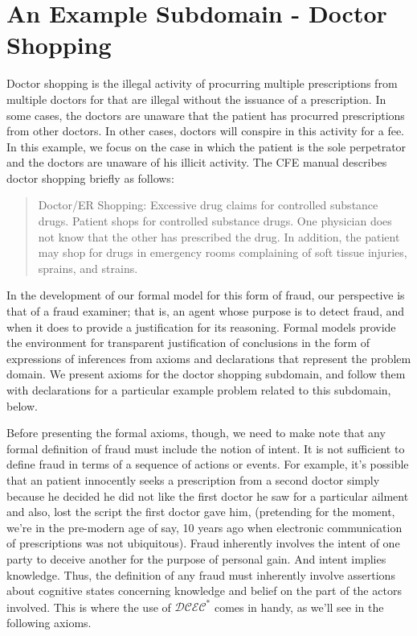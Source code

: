 \section{An Example Subdomain - Doctor Shopping}

Doctor shopping is the illegal activity of procurring multiple prescriptions from multiple doctors for that are illegal without the issuance of a prescription.  In some cases, the doctors are unaware that the patient has procurred prescriptions from other doctors.  In other cases, doctors will conspire in this activity for a fee.  In this example, we focus on the case in which the patient is the sole perpetrator and the doctors are unaware of his illicit activity.  The CFE manual describes doctor shopping briefly as follows:

\blockquote{Doctor/ER Shopping: 
Excessive drug claims for controlled substance drugs. Patient shops for controlled 
substance drugs. One physician does not know that the other has prescribed the drug. In 
addition, the patient may shop for drugs in emergency rooms complaining of soft tissue 
injuries, sprains, and strains.}

In the development of our formal model for this form of fraud, our perspective is that of a fraud examiner; that is, an agent whose purpose is to detect fraud, and when it does to provide a justification for its reasoning.  Formal models provide the environment for transparent  justification of conclusions in the form of expressions of inferences from axioms and declarations that represent the problem domain.  We present axioms for the doctor shopping subdomain, and follow them with declarations for a particular example problem related to this subdomain, below.

Before presenting the formal axioms, though, we need to make note that any formal definition of fraud must include the notion of intent.  It is not sufficient to define fraud in terms of a sequence of actions or events.  For example, it's possible that an patient innocently seeks a prescription from a second doctor simply because he decided he did not like the first doctor he saw for a particular ailment and also, lost the script the first doctor gave him, (pretending for the moment, we're in the pre-modern age of say, 10 years ago when electronic communication of prescriptions was not ubiquitous).  Fraud inherently involves the intent of one party to deceive another for the purpose of personal gain.  And intent implies knowledge.  Thus, the definition of any fraud must inherently involve assertions about cognitive states concerning knowledge and belief on the part of the actors involved.  This is where the use of $\mathcal{DCEC}^\ast$ comes in handy, as we'll see in the following axioms.

